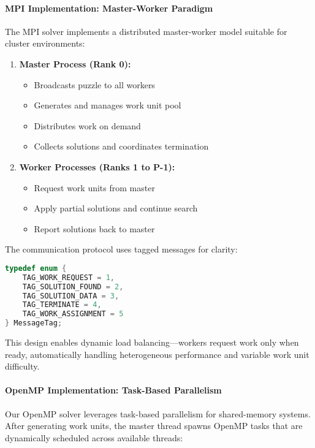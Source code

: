 \paragraph{MPI Implementation: Master-Worker Paradigm}
\label{par:mpi_implementation}
The MPI solver implements a distributed master-worker model suitable for cluster environments:

\begin{enumerate}
    \item \textbf{Master Process (Rank 0):}
    \begin{itemize}
        \item Broadcasts puzzle to all workers
        \item Generates and manages work unit pool
        \item Distributes work on demand
        \item Collects solutions and coordinates termination
    \end{itemize}
    
    \item \textbf{Worker Processes (Ranks 1 to P-1):}
    \begin{itemize}
        \item Request work units from master
        \item Apply partial solutions and continue search
        \item Report solutions back to master
    \end{itemize}
\end{enumerate}

The communication protocol uses tagged messages for clarity:

\begin{lstlisting}[language=C, caption=MPI communication tags]
typedef enum {
    TAG_WORK_REQUEST = 1,
    TAG_SOLUTION_FOUND = 2,
    TAG_SOLUTION_DATA = 3,
    TAG_TERMINATE = 4,
    TAG_WORK_ASSIGNMENT = 5
} MessageTag;
\end{lstlisting}

This design enables dynamic load balancing—workers request work only when ready, automatically handling heterogeneous performance and variable work unit difficulty.


\paragraph{OpenMP Implementation: Task-Based Parallelism}
\label{par:omp_implementation}
Our OpenMP solver leverages task-based parallelism for shared-memory systems. After generating work units, the master thread spawns OpenMP tasks that are dynamically scheduled across available threads:

